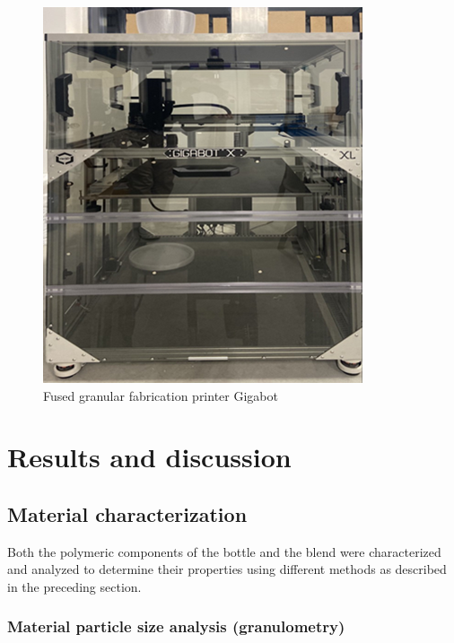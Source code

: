 \documentclass[
]{article}
\begin{document}
\begin{figure}

{\centering \includegraphics{figures/Figure_4_Giga.png}

}

\caption{\label{fig-gigabot}Fused granular fabrication printer Gigabot}

\end{figure}

\hypertarget{results-and-discussion}{%
\section{Results and discussion}\label{results-and-discussion}}

\hypertarget{material-characterization}{%
\subsection{Material characterization}\label{material-characterization}}

Both the polymeric components of the bottle and the blend were
characterized and analyzed to determine their properties using different
methods as described in the preceding section.

\hypertarget{material-particle-size-analysis-granulometry}{%
\subsubsection{Material particle size analysis
(granulometry)}\label{material-particle-size-analysis-granulometry}}
\end{document}
